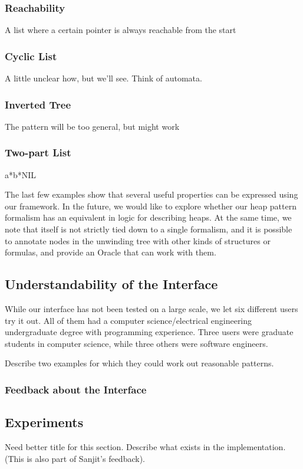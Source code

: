 \subsubsection{Reachability}
A list where a certain pointer is always reachable from the start

\subsubsection{Cyclic List}
A little unclear how, but we'll see. Think of automata.

\subsubsection{Inverted Tree}
The pattern will be too general, but might work

\subsubsection{Two-part List}
a*b*NIL

The last few examples show that several useful properties can be expressed using our
framework. In the future, we would like to explore whether our heap pattern formalism
has an equivalent in logic for describing heaps. At the same time, we note that
\verifier itself is not strictly tied down to a single formalism, and it is possible to
annotate nodes in the unwinding tree with other kinds of structures or formulas, and
provide an Oracle that can work with them.

\subsection{Understandability of the Interface}
\label{sec:understandability-of-interface}
While our interface has not been tested on a large scale, we let six different users try
it out. All of them had a computer science/electrical engineering undergraduate degree
with programming experience. Three users were graduate students in computer science,
while three others were software engineers.

Describe two examples for which they could work out reasonable patterns.

\subsubsection{Feedback about the Interface}

\subsection{Experiments}
Need better title for this section. Describe what exists in the implementation.
(This is also part of Sanjit's feedback).

